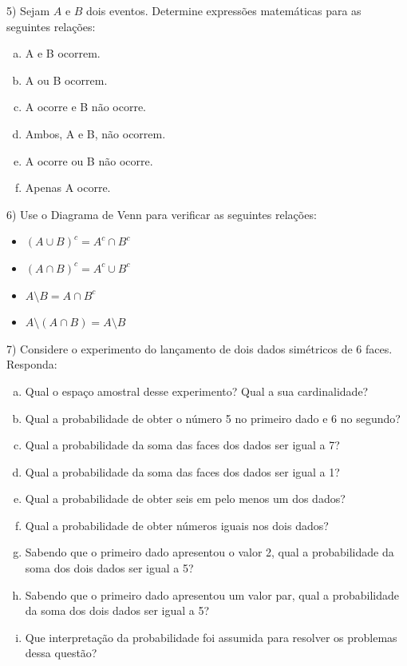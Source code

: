 \documentclass[12pt]{article}
\begin{document}
\vspace{5px}


5) Sejam $A$ e $B$ dois eventos. Determine expressões matemáticas para as seguintes relações:

\begin{enumerate}[a)]
    \item A e B ocorrem. 
    \item A ou B ocorrem.
    \item A ocorre e B não ocorre. 
    \item Ambos, A e B, não ocorrem. 
    \item A ocorre ou B não ocorre. 
    \item Apenas A ocorre. 
\end{enumerate}

\vspace{5px}

6) Use o Diagrama de Venn para verificar as seguintes relações:

\begin{itemize}
    \item $(A \cup B)^c = A^c \cap B^c $
    \item $(A \cap B)^c = A^c \cup B^c $
    \item $A \setminus B =  A \cap B^c$
    \item $A \setminus (A \cap B) =  A \setminus B$
\end{itemize}

\vspace{5px}

7) Considere o experimento do lançamento de dois dados simétricos de 6 faces. Responda: 

\begin{enumerate}[a)]
    \item Qual o espaço amostral desse experimento? Qual a sua cardinalidade?
    \item Qual a probabilidade de obter o número 5 no primeiro dado e 6 no segundo?
    \item Qual a probabilidade da soma das faces dos dados ser igual a 7? 
    \item Qual a probabilidade da soma das faces dos dados ser igual a 1?
    \item Qual a probabilidade de obter seis em pelo menos um dos dados?
    \item Qual a probabilidade de obter números iguais nos dois dados?
    \item Sabendo que o primeiro dado apresentou o valor 2, qual a probabilidade da soma dos dois dados ser igual a 5?
    \item Sabendo que o primeiro dado apresentou um valor par, qual a probabilidade da soma dos dois dados ser igual a 5?
    \item Que interpretação da probabilidade foi assumida para resolver os problemas dessa questão?
\end{enumerate}
\end{document}
